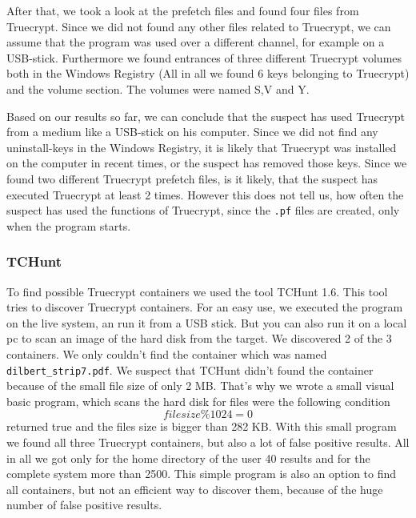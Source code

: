 After that, we took a look at the prefetch files and found four files from Truecrypt. Since we did not found any other files related to Truecrypt, we can assume that the program was used over a different channel, for example on a USB-stick. Furthermore we found entrances of three different Truecrypt volumes both in the  Windows Registry (All in all we found 6 keys belonging to Truecrypt) and the volume section. The volumes were named S,V and Y.

Based on our results so far, we can conclude that the suspect has used Truecrypt from a medium like a USB-stick on his computer. Since we did not find any uninstall-keys in the  Windows Registry, it is likely that Truecrypt was installed on the computer in recent times, or the suspect has removed those keys. Since we found two different Truecrypt prefetch files, is it likely, that the suspect has executed Truecrypt at least 2 times. However this does not tell us, how often the suspect has used the functions of Truecrypt, since the \texttt{.pf} files are created, only when the program starts.

\subsubsection{TCHunt}
To find possible Truecrypt containers we used the tool TCHunt 1.6. This tool tries to discover Truecrypt containers. For an easy use, we executed the program on the live system, an run it from a USB stick. But you can also run it on a local pc to scan an image of the hard disk from the target. We discovered 2 of the 3 containers. We only couldn't find the container which was named \texttt{dilbert\_strip7.pdf}. We suspect that TCHunt didn't found the container because of the small file size of only 2 MB. That's why we wrote a small visual basic program, which scans the hard disk for files were the following condition  \[filesize \% 1024 = 0\] returned true and the files size is bigger than 282 KB. With this small program we found all three Truecrypt containers, but also a lot of false positive results. All in all we got only for the home directory of the user 40 results and for the complete system more than 2500. This simple program is also an option to find all containers, but not an efficient way to discover them, because of the huge number of false positive results.  

